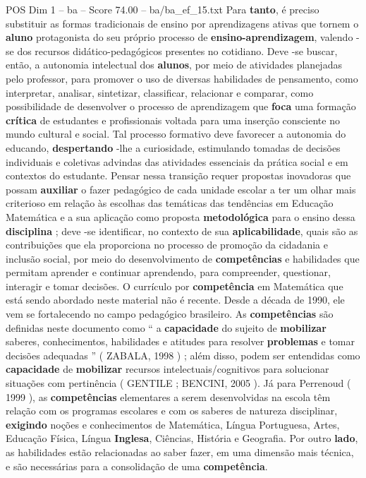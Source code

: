 \begin{textsample}{POS Dim 1 – ba – Score 74.00 – ba/ba\_ef\_15.txt}
Para \textbf{tanto}, é preciso substituir as formas tradicionais de ensino por aprendizagens ativas que tornem o \textbf{aluno} protagonista do seu próprio processo de \textbf{ensino-aprendizagem}, valendo -se dos recursos didático-pedagógicos presentes no cotidiano.
Deve -se buscar, então, a autonomia intelectual dos \textbf{alunos}, por meio de atividades planejadas pelo professor, para promover o uso de diversas habilidades de pensamento, como interpretar, analisar, sintetizar, classificar, relacionar e comparar, como possibilidade de desenvolver o processo de aprendizagem que \textbf{foca} uma formação \textbf{crítica} de estudantes e profissionais voltada para uma inserção consciente no mundo cultural e social.
Tal processo formativo deve favorecer a autonomia do educando, \textbf{despertando} -lhe a curiosidade, estimulando tomadas de decisões individuais e coletivas advindas das atividades essenciais da prática social e em contextos do estudante.
Pensar nessa transição requer propostas inovadoras que possam \textbf{auxiliar} o fazer pedagógico de cada unidade escolar a ter um olhar mais criterioso em relação às escolhas das temáticas das tendências em Educação Matemática e a sua aplicação como proposta \textbf{metodológica} para o ensino dessa \textbf{disciplina} ; deve -se identificar, no contexto de sua \textbf{aplicabilidade}, quais são as contribuições que ela proporciona no processo de promoção da cidadania e inclusão social, por meio do desenvolvimento de \textbf{competências} e habilidades que permitam aprender e continuar aprendendo, para compreender, questionar, interagir e tomar decisões.
O currículo por \textbf{competência} em Matemática que está sendo abordado neste material não é recente.
Desde a década de 1990, ele vem se fortalecendo no campo pedagógico brasileiro.
As \textbf{competências} são definidas neste documento como “ a \textbf{capacidade} do sujeito de \textbf{mobilizar} saberes, conhecimentos, habilidades e atitudes para resolver \textbf{problemas} e tomar decisões adequadas ” ( ZABALA, 1998 ) ; além disso, podem ser entendidas como \textbf{capacidade} de \textbf{mobilizar} recursos intelectuais/cognitivos para solucionar situações com pertinência ( GENTILE ; BENCINI, 2005 ).
Já para Perrenoud ( 1999 ), as \textbf{competências} elementares a serem desenvolvidas na escola têm relação com os programas escolares e com os saberes de natureza disciplinar, \textbf{exigindo} noções e conhecimentos de Matemática, Língua Portuguesa, Artes, Educação Física, Língua \textbf{Inglesa}, Ciências, História e Geografia.
Por outro \textbf{lado}, as habilidades estão relacionadas ao saber fazer, em uma dimensão mais técnica, e são necessárias para a consolidação de uma \textbf{competência}.

\end{textsample}
